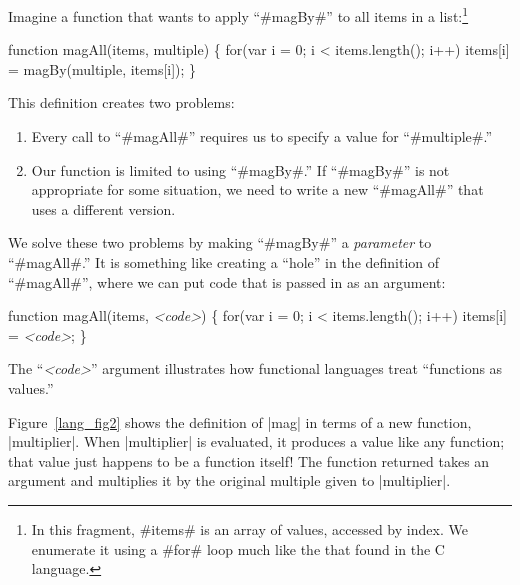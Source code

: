 \documentclass[12pt]{report}
\begin{document}
Imagine a function that wants to apply ``#magBy#'' to all items in a
list:\footnote{In this fragment, #items# is an array of values,
  accessed by index. We enumerate it using a #for# loop much like the
  that found in the C language.}
\begin{AVerb}
function magAll(items, multiple) \{
  for(var i = 0; i < items.length(); i++)
    items[i] = magBy(multiple, items[i]);
\}
\end{AVerb}
This definition creates two problems:
\begin{enumerate}
\item Every call to ``#magAll#'' requires us to specify a value for
  ``#multiple#.'' 
\item Our function is limited to using ``#magBy#.'' If ``#magBy#''
  is not appropriate for some situation, we need to write a new
  ``#magAll#'' that uses a different version.
\end{enumerate}
We solve these two problems by making ``#magBy#'' a \emph{parameter}
to ``#magAll#.'' It is something like creating a ``hole'' in the
definition of ``#magAll#'', where we can put code that is passed in as
an argument:
\begin{AVerb}
function magAll(items, \emph{<code>}) \{
  for(var i = 0; i < items.length(); i++)
    items[i] = \emph{<code>};
\}
\end{AVerb}
The ``\emph{<code>}'' argument illustrates how functional languages
treat ``functions as values.''

Figure~\ref{lang_fig2} shows the definition of |mag| in terms of a
new function, |multiplier|.  When |multiplier| is evaluated, it
produces a value like any function; that value just happens to be a
function itself! The function returned takes an argument and
multiplies it by the original multiple given to |multiplier|.
\end{document}
